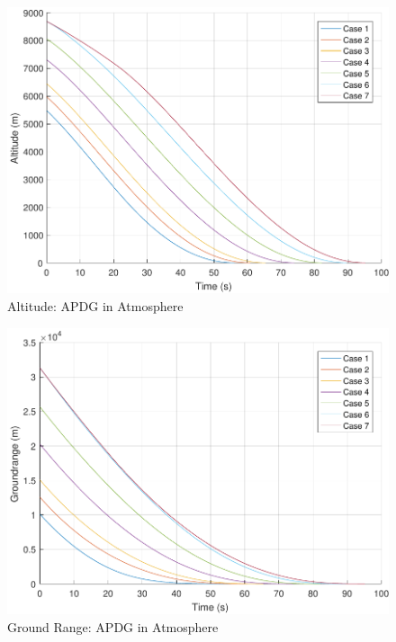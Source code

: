 \begin{figure}[H]
	\centering
	\begin{minipage}{4.3 in}
		\includegraphics[width=\linewidth]{Figures/altpowatmo.pdf}
		\caption{Altitude: APDG in Atmosphere \label{fig:altpowatmo} }
	\end{minipage}
\end{figure}

\begin{figure}[H]
	\centering
	\begin{minipage}{4.3 in}
		\includegraphics[width=\linewidth]{Figures/rngpowatmo.pdf}
		\caption{Ground Range: APDG in Atmosphere \label{fig:rngpowatmo} }
	\end{minipage}
\end{figure}

